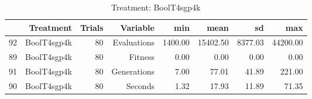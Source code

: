 \begin{table}[ht]
\centering
\begin{tabular}{rrrrrrrr}
  \hline
 & Treatment & Trials & Variable & min & mean & sd & max \\ 
  \hline
92 & BoolT4sgp4k &  80 & Evaluations & 1400.00 & 15402.50 & 8377.03 & 44200.00 \\ 
  89 & BoolT4sgp4k &  80 & Fitness & 0.00 & 0.00 & 0.00 & 0.00 \\ 
  91 & BoolT4sgp4k &  80 & Generations & 7.00 & 77.01 & 41.89 & 221.00 \\ 
  90 & BoolT4sgp4k &  80 & Seconds & 1.32 & 17.93 & 11.89 & 71.35 \\ 
   \hline
\end{tabular}
\caption{Treatment: BoolT4sgp4k} 
\end{table}

